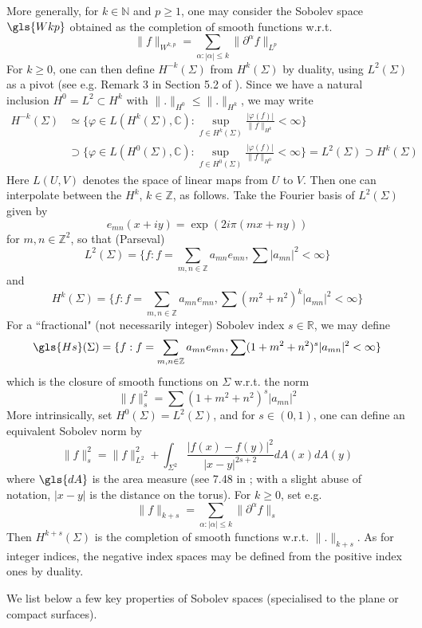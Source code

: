 \documentclass[10pt]{article}
\newcommand{\Z}{\mathbb{Z}}
\newcommand{\R}{\mathbb{R}}
\newcommand{\N}{\mathbb{N}}
\newcommand{\C}{\mathbb{C}}
\begin{document}
More generally, for $k\in\N$ and $p\geq 1$, one may consider the Sobolev space $\gls{Wkp}$ obtained as the completion of smooth functions w.r.t.
$$\|f\|_{W^{k,p}}=\sum_{\alpha:|\alpha|\leq k}\|\partial^{\alpha}f\|_{L^p}$$
For $k\geq 0$, one can then define $H^{-k}(\Sigma)$ from $H^k(\Sigma)$ by duality, using $L^2(\Sigma)$ as a pivot (see e.g. Remark 3 in Section 5.2 of \cite{Brezis}). Since we have a natural inclusion $H^0=L^2\subset H^k$ with $\|.\|_{H^0}\leq\|.\|_{H^k}$, we may write 
\begin{align*}
H^{-k}(\Sigma)&\simeq\{\varphi\in L(H^k(\Sigma),\C):\sup_{f\in H^k(\Sigma)}\frac{|\varphi(f)|}{\|f\|_{H^k}}<\infty\}\\
&\supset \{\varphi\in L(H^0(\Sigma),\C):\sup_{f\in H^0(\Sigma)}\frac{|\varphi(f)|}{\|f\|_{H^0}}<\infty\}=L^2(\Sigma)\supset H^k(\Sigma)
\end{align*}
Here $L(U,V)$ denotes the space of linear maps from $U$ to $V$. Then one can interpolate between the $H^k$, $k\in\Z$, as follows. Take the Fourier basis of $L^2(\Sigma)$ given by 
$$e_{mn}(x+iy)=\exp(2i\pi(mx+ny))$$
for $m,n\in\Z^2$, so that (Parseval)
$$L^2(\Sigma)=\{f:f=\sum_{m,n\in\Z}a_{mn}e_{mn}, \sum |a_{mn}|^2<\infty\}$$
and
$$H^k(\Sigma)=\{f:f=\sum_{m,n\in\Z}a_{mn}e_{mn}, \sum (m^2+n^2)^k|a_{mn}|^2<\infty\}$$
For a ``fractional" (not necessarily integer) Sobolev index $s\in\R$, we may define
\begin{equation}\label{eq:defHs}
\gls{Hs}(\Sigma)=\{f:f=\sum_{m,n\in\Z}a_{mn}e_{mn}, \sum (1+m^2+n^2)^s|a_{mn}|^2<\infty\}
\end{equation}
which is the closure of smooth functions on $\Sigma$ w.r.t. the norm
$$\|f\|_s^2=\sum (1+m^2+n^2)^s|a_{mn}|^2$$
More intrinsically, set $H^0(\Sigma)=L^2(\Sigma)$, and for $s\in (0,1)$, one can define an equivalent Sobolev norm by
$$\|f\|_s^2=\|f\|_{L^2}^2+\int_{\Sigma^2}\frac{|f(x)-f(y)|^2}{|x-y|^{2s+2}}dA(x)dA(y)$$
where $\gls{dA}$ is the area measure (see 7.48 in \cite{Adams_Sobolev}; with a slight abuse of notation, $|x-y|$ is the distance on the torus). For $k\geq 0$, set e.g.
$$\|f\|_{k+s}=\sum_{\alpha:|\alpha|\leq k}\|\partial^\alpha f\|_s$$
Then $H^{k+s}(\Sigma)$ is the completion of smooth functions w.r.t. $\|.\|_{k+s}$. As for integer indices, the negative index spaces may be defined from the positive index ones by duality.

We list below a few key properties of Sobolev spaces (specialised to the plane or compact surfaces). 
\end{document}
